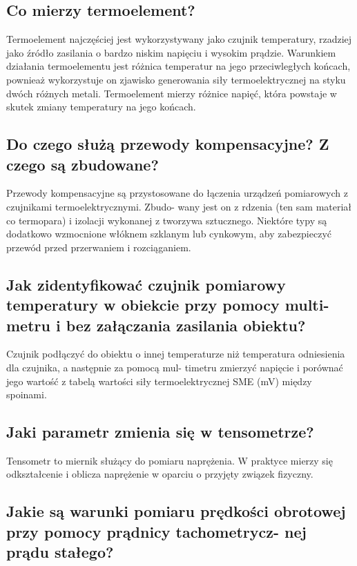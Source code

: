 \documentclass{article}
\begin{document}
\subsection{Co mierzy termoelement?}
Termoelement najczęściej jest wykorzystywany jako czujnik temperatury, rzadziej jako źródło zasilania o bardzo niskim
napięciu i wysokim prądzie. Warunkiem działania termoelementu jest różnica temperatur na jego przeciwległych końcach,
pownieaż wykorzystuje on zjawisko generowania siły termoelektrycznej na styku dwóch różnych metali. Termoelement
mierzy różnice napięć, która powstaje w skutek zmiany temperatury na jego końcach.

\subsection{Do czego służą przewody kompensacyjne? Z czego są zbudowane?}
Przewody kompensacyjne są przystosowane do łączenia urządzeń pomiarowych z czujnikami termoelektrycznymi. Zbudo-
wany jest on z rdzenia (ten sam materiał co termopara) i izolacji wykonanej z tworzywa sztucznego. Niektóre typy są
dodatkowo wzmocnione włóknem szklanym lub cynkowym, aby zabezpieczyć przewód przed przerwaniem i rozciąganiem.

\subsection{Jak zidentyfikować czujnik pomiarowy temperatury w obiekcie przy pomocy multi-
metru i bez załączania zasilania obiektu?}

Czujnik podłączyć do obiektu o innej temperaturze niż temperatura odniesienia dla czujnika, a następnie za pomocą mul-
timetru zmierzyć napięcie i porównać jego wartość z tabelą wartości siły termoelektrycznej SME (mV) między spoinami.

\subsection{Jaki parametr zmienia się w tensometrze?}

Tensometr to miernik służący do pomiaru naprężenia. W praktyce mierzy się odkształcenie i oblicza naprężenie w oparciu
o przyjęty związek fizyczny.

\subsection{Jakie są warunki pomiaru prędkości obrotowej przy pomocy prądnicy tachometrycz-
nej prądu stałego?}
\end{document}
